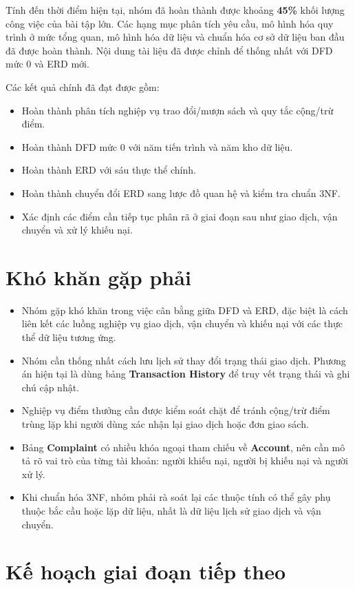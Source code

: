 \documentclass{article}
\begin{document}
Tính đến thời điểm hiện tại, nhóm đã hoàn thành được khoảng \textbf{45\%} khối lượng công việc của bài tập lớn. Các hạng mục phân tích yêu cầu, mô hình hóa quy trình ở mức tổng quan, mô hình hóa dữ liệu và chuẩn hóa cơ sở dữ liệu ban đầu đã được hoàn thành. Nội dung tài liệu đã được chỉnh để thống nhất với DFD mức 0 và ERD mới.

Các kết quả chính đã đạt được gồm:
\begin{itemize}
    \item Hoàn thành phân tích nghiệp vụ trao đổi/mượn sách và quy tắc cộng/trừ điểm.
    \item Hoàn thành DFD mức 0 với năm tiến trình và năm kho dữ liệu.
    \item Hoàn thành ERD với sáu thực thể chính.
    \item Hoàn thành chuyển đổi ERD sang lược đồ quan hệ và kiểm tra chuẩn 3NF.
    \item Xác định các điểm cần tiếp tục phân rã ở giai đoạn sau như giao dịch, vận chuyển và xử lý khiếu nại.
\end{itemize}

\section{Khó khăn gặp phải}

\begin{itemize}
    \item Nhóm gặp khó khăn trong việc cân bằng giữa DFD và ERD, đặc biệt là cách liên kết các luồng nghiệp vụ giao dịch, vận chuyển và khiếu nại với các thực thể dữ liệu tương ứng.
    \item Nhóm cần thống nhất cách lưu lịch sử thay đổi trạng thái giao dịch. Phương án hiện tại là dùng bảng \textbf{Transaction History} để truy vết trạng thái và ghi chú cập nhật.
    \item Nghiệp vụ điểm thưởng cần được kiểm soát chặt để tránh cộng/trừ điểm trùng lặp khi người dùng xác nhận lại giao dịch hoặc đơn giao sách.
    \item Bảng \textbf{Complaint} có nhiều khóa ngoại tham chiếu về \textbf{Account}, nên cần mô tả rõ vai trò của từng tài khoản: người khiếu nại, người bị khiếu nại và người xử lý.
    \item Khi chuẩn hóa 3NF, nhóm phải rà soát lại các thuộc tính có thể gây phụ thuộc bắc cầu hoặc lặp dữ liệu, nhất là dữ liệu lịch sử giao dịch và vận chuyển.
\end{itemize}

\section{Kế hoạch giai đoạn tiếp theo}
\end{document}
